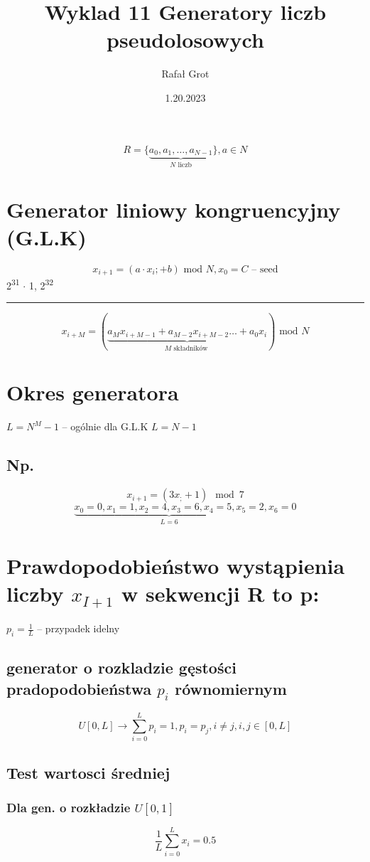 \documentclass[11pt]{article}
\author{Rafał Grot}
\date{1.20.2023}
\title{Wyklad 11 Generatory liczb pseudolosowych}
\begin{document}
\maketitle
\tableofcontents

$$R = \{\underbrace{a_0, a_{1}, \ldots , a_{N-1}}_{N \text{ liczb} }\}, a \in N$$
\section{Generator liniowy kongruencyjny (G.L.K)}
\label{sec:org14f8ad7}
$$x_{i+1} = (a \cdot x_{i} ;+b ) \text{ mod } N, x_0 = C \text{ -- seed}$$
2\textsuperscript{31} \(\cdot\) 1, 2\textsuperscript{32}

\noindent\rule{\textwidth}{0.5pt}
$$x_{i+M} = ( \underbrace{ a_{M} x_{i+M-1} + a_{M-2}x_{i+M-2} \ldots + a_{0}x_{i} }_{M \text{ składników }}) \text{ mod } N$$

\section{Okres generatora}
\label{sec:orga356c1b}
\(L = N^{M} -1\) -- ogólnie dla G.L.K
\(L = N -1\)
\subsection{Np.}
\label{sec:orgea7a155}
$$x_{i+1} = (3 x_; +1) \mod 7$$
$$\underbrace{x_0 = 0,x_1=1, x_2 =4 , x_3=6, x_4 = 5, x_5 = 2}_{L = 6}, x_6 = 0$$
\section{Prawdopodobieństwo wystąpienia liczby \(x_{I+1}\) w sekwencji R to p:}
\label{sec:org7c025b1}
\(p_i = \frac{1}{L}\) -- przypadek idelny
\subsection{generator o rozkladzie gęstości pradopodobieństwa \(p_i\) równomiernym}
\label{sec:org33dc136}
$$U[0,L] \to \sum_{i=0}^{L}p_{i} =1, p_{i} = p_{j}, i \neq j, i,j \in {[0,L]} $$
\subsection{Test wartosci średniej}
\label{sec:org54f1d57}
\subsubsection{Dla gen. o rozkładzie \(U[0,1]\)}
\label{sec:orgb2678b7}
$$\frac{1}{L} \sum_{i=0}^{L} x_{i} = 0.5$$
\end{document}
